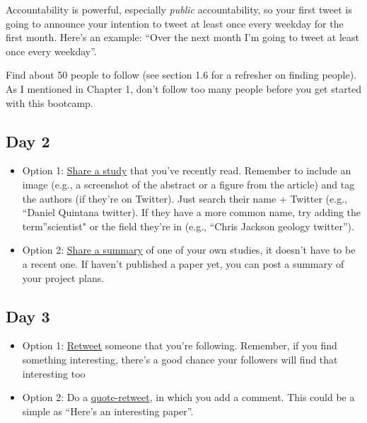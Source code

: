 \documentclass[
]{book}
\providecommand{\tightlist}{%
  \setlength{\itemsep}{0pt}\setlength{\parskip}{0pt}}
\begin{document}
Accountability is powerful, especially \emph{public} accountability, so your first tweet is going to announce your intention to tweet at least once every weekday for the first month. Here's an example: ``Over the next month I'm going to tweet at least once every weekday''.

Find about 50 people to follow (see section 1.6 for a refresher on finding people). As I mentioned in Chapter 1, don't follow too many people before you get started with this bootcamp.

\hypertarget{day-2}{%
\subsection*{Day 2}\label{day-2}}

\begin{itemize}
\tightlist
\item
  Option 1: \protect\hyperlink{composing}{Share a study} that you've recently read. Remember to include an image (e.g., a screenshot of the abstract or a figure from the article) and tag the authors (if they're on Twitter). Just search their name + Twitter (e.g., ``Daniel Quintana twitter). If they have a more common name, try adding the term''scientist" or the field they're in (e.g., ``Chris Jackson geology twitter'').
\item
  Option 2: \protect\hyperlink{composing}{Share a summary} of one of your own studies, it doesn't have to be a recent one. If haven't published a paper yet, you can post a summary of your project plans.
\end{itemize}

\hypertarget{day-3}{%
\subsection*{Day 3}\label{day-3}}

\begin{itemize}
\tightlist
\item
  Option 1: \protect\hyperlink{beginner}{Retweet} someone that you're following. Remember, if you find something interesting, there's a good chance your followers will find that interesting too
\item
  Option 2: Do a \protect\hyperlink{beginner}{quote-retweet}, in which you add a comment. This could be a simple as ``Here's an interesting paper''.
\end{itemize}
\end{document}
